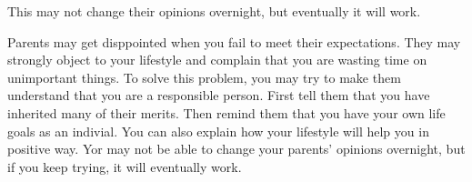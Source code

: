 \documentclass[11pt,a4paper]{article}
\begin{document}
\begin{paracol}{2}

This may not change their opinions overnight, but eventually it will work.






\normalsize
\switchcolumn

\vspace{1em}





Parents may get disppointed when you fail to meet their expectations.
They may strongly object to your lifestyle and complain that you are wasting time on unimportant things.
To solve this problem, you may try to make them understand that you are a responsible person.
First tell them that you have inherited many of their merits.
Then remind them that you have your own life goals as an indivial.
You can also explain how your lifestyle will help you in positive way.
Yor may not be able to change your parents' opinions overnight, 
but if you keep trying, it will eventually work.








\end{paracol}
\end{document}
